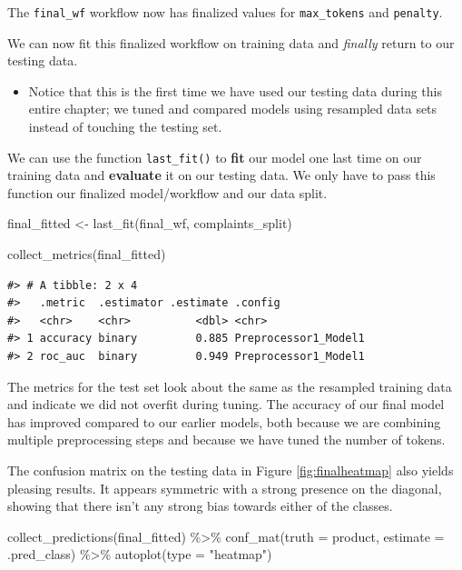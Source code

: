 \documentclass[
]{krantz}
\makeatletter
\newenvironment{Shaded}{\begin{snugshade}}{\end{snugshade}}
\newcommand{\AttributeTok}[1]{\textcolor[rgb]{0.77,0.63,0.00}{#1}}
\newcommand{\FunctionTok}[1]{\textcolor[rgb]{0.00,0.00,0.00}{#1}}
\newcommand{\NormalTok}[1]{#1}
\newcommand{\OtherTok}[1]{\textcolor[rgb]{0.56,0.35,0.01}{#1}}
\newcommand{\SpecialCharTok}[1]{\textcolor[rgb]{0.00,0.00,0.00}{#1}}
\newcommand{\StringTok}[1]{\textcolor[rgb]{0.31,0.60,0.02}{#1}}
\newenvironment{kframe}{%
\medskip{}
\setlength{\fboxsep}{.8em}
 \def\at@end@of@kframe{}%
 \ifinner\ifhmode%
  \def\at@end@of@kframe{\end{minipage}}%
  \begin{minipage}{\columnwidth}%
 \fi\fi%
 \def\FrameCommand##1{\hskip\@totalleftmargin \hskip-\fboxsep
 \colorbox{shadecolor}{##1}\hskip-\fboxsep
     \hskip-\linewidth \hskip-\@totalleftmargin \hskip\columnwidth}%
 \MakeFramed {\advance\hsize-\width
   \@totalleftmargin\z@ \linewidth\hsize
   \@setminipage}}%
 {\par\unskip\endMakeFramed%
 \at@end@of@kframe}
\renewenvironment{Shaded}{\begin{kframe}}{\end{kframe}}
\newenvironment{rmdblock}[1]
  {\begin{shaded*}
  \begin{itemize}[left = -1cm, labelsep = 1cm]
  \renewcommand{\labelitemi}{
    \raisebox{-.7\height}[0pt][0pt]{
      {\setkeys{Gin}{width=3em,keepaspectratio}\texttt{[image: images/\#1]}}
    }
  }
 
  \item
  }
  {
  \end{itemize}
  \end{shaded*}
  }
\newenvironment{rmdwarning}
  {\begin{rmdblock}{warning}}
  {\end{rmdblock}}
\makeatother
\begin{document}
The \texttt{final\_wf} workflow now has finalized values for \texttt{max\_tokens} and \texttt{penalty}.

We can now fit this finalized workflow on training data and \emph{finally} return to our testing data.

\begin{rmdwarning}
Notice that this is the first time we have used our testing data during
this entire chapter; we tuned and compared models using resampled data
sets instead of touching the testing set.
\end{rmdwarning}

We can use the function \texttt{last\_fit()} to \textbf{fit} our model one last time on our training data and \textbf{evaluate} it on our testing data. We only have to pass this function our finalized model/workflow and our data split.

\begin{Shaded}
\begin{Highlighting}[]
\NormalTok{final\_fitted }\OtherTok{\textless{}{-}} \FunctionTok{last\_fit}\NormalTok{(final\_wf, complaints\_split)}

\FunctionTok{collect\_metrics}\NormalTok{(final\_fitted)}
\end{Highlighting}
\end{Shaded}

\begin{verbatim}
#> # A tibble: 2 x 4
#>   .metric  .estimator .estimate .config             
#>   <chr>    <chr>          <dbl> <chr>               
#> 1 accuracy binary         0.885 Preprocessor1_Model1
#> 2 roc_auc  binary         0.949 Preprocessor1_Model1
\end{verbatim}

The metrics for the test set look about the same as the resampled training data and indicate we did not overfit during tuning. The accuracy of our final model has improved compared to our earlier models, both because we are combining multiple preprocessing steps and because we have tuned the number of tokens.

The confusion matrix on the testing data in Figure \ref{fig:finalheatmap} also yields pleasing results. It appears symmetric with a strong presence on the diagonal, showing that there isn't any strong bias towards either of the classes.

\begin{Shaded}
\begin{Highlighting}[]
\FunctionTok{collect\_predictions}\NormalTok{(final\_fitted) }\SpecialCharTok{\%\textgreater{}\%}
  \FunctionTok{conf\_mat}\NormalTok{(}\AttributeTok{truth =}\NormalTok{ product, }\AttributeTok{estimate =}\NormalTok{ .pred\_class) }\SpecialCharTok{\%\textgreater{}\%}
  \FunctionTok{autoplot}\NormalTok{(}\AttributeTok{type =} \StringTok{"heatmap"}\NormalTok{)}
\end{Highlighting}
\end{Shaded}
\end{document}
